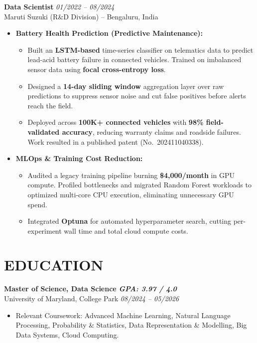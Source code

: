 \documentclass[9pt]{article}
\begin{document}
\vspace{2pt}

\textbf{Data Scientist} \hfill \textit{01/2022 -- 08/2024}\\
Maruti Suzuki (R\&D Division) -- Bengaluru, India
\begin{itemize}
    \item \textbf{Battery Health Prediction (Predictive Maintenance):}
    \begin{itemize}
        \item Built an \textbf{LSTM-based} time-series classifier on telematics data to predict lead-acid battery failure in connected vehicles. Trained on imbalanced sensor data using \textbf{focal cross-entropy loss}.
        \item Designed a \textbf{14-day sliding window} aggregation layer over raw predictions to suppress sensor noise and cut false positives before alerts reach the field.
        \item Deployed across \textbf{100K+ connected vehicles} with \textbf{98\% field-validated accuracy}, reducing warranty claims and roadside failures. Work resulted in a published patent (No.~202411040338).
    \end{itemize}
    \item \textbf{MLOps \& Training Cost Reduction:}
    \begin{itemize}
        \item Audited a legacy training pipeline burning \textbf{\$4,000/month} in GPU compute. Profiled bottlenecks and migrated Random Forest workloads to optimized multi-core CPU execution, eliminating unnecessary GPU spend.
        \item Integrated \textbf{Optuna} for automated hyperparameter search, cutting per-experiment wall time and total cloud compute costs.
    \end{itemize}
\end{itemize}

\vspace{1pt}
\section*{EDUCATION}

\textbf{Master of Science, Data Science} \hfill \textbf{\textit{GPA: 3.97 / 4.0}}\\
University of Maryland, College Park \hfill \textit{08/2024 -- 05/2026}
\begin{itemize}
    \item Relevant Coursework: Advanced Machine Learning, Natural Language Processing, Probability \& Statistics, Data Representation \& Modelling, Big Data Systems, Cloud Computing.
\end{itemize}
\vspace{3pt}
\end{document}
